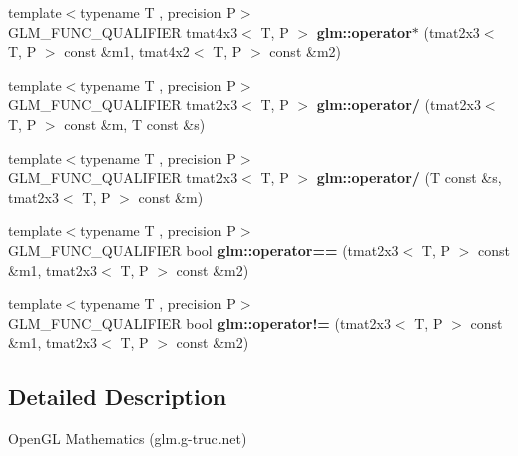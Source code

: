 \begin{DoxyCompactItemize}
\item 
\hypertarget{namespaceglm_ad6fbbb47791ef5cf25d6e85478b0ac07}{{\footnotesize template$<$typename T , precision P$>$ }\\G\-L\-M\-\_\-\-F\-U\-N\-C\-\_\-\-Q\-U\-A\-L\-I\-F\-I\-E\-R tmat4x3$<$ T, P $>$ {\bfseries glm\-::operator$\ast$} (tmat2x3$<$ T, P $>$ const \&m1, tmat4x2$<$ T, P $>$ const \&m2)}\label{namespaceglm_ad6fbbb47791ef5cf25d6e85478b0ac07}

\item 
\hypertarget{namespaceglm_a7bd8e96d855416d5a0bb2ee8933720d9}{{\footnotesize template$<$typename T , precision P$>$ }\\G\-L\-M\-\_\-\-F\-U\-N\-C\-\_\-\-Q\-U\-A\-L\-I\-F\-I\-E\-R tmat2x3$<$ T, P $>$ {\bfseries glm\-::operator/} (tmat2x3$<$ T, P $>$ const \&m, T const \&s)}\label{namespaceglm_a7bd8e96d855416d5a0bb2ee8933720d9}

\item 
\hypertarget{namespaceglm_a7f733aa2965f6acb67a211a5cd8dd2d0}{{\footnotesize template$<$typename T , precision P$>$ }\\G\-L\-M\-\_\-\-F\-U\-N\-C\-\_\-\-Q\-U\-A\-L\-I\-F\-I\-E\-R tmat2x3$<$ T, P $>$ {\bfseries glm\-::operator/} (T const \&s, tmat2x3$<$ T, P $>$ const \&m)}\label{namespaceglm_a7f733aa2965f6acb67a211a5cd8dd2d0}

\item 
\hypertarget{namespaceglm_ac912517a461de497022d75ec4de3dba5}{{\footnotesize template$<$typename T , precision P$>$ }\\G\-L\-M\-\_\-\-F\-U\-N\-C\-\_\-\-Q\-U\-A\-L\-I\-F\-I\-E\-R bool {\bfseries glm\-::operator==} (tmat2x3$<$ T, P $>$ const \&m1, tmat2x3$<$ T, P $>$ const \&m2)}\label{namespaceglm_ac912517a461de497022d75ec4de3dba5}

\item 
\hypertarget{namespaceglm_aa83d47e20bf01d8d4009de4d5440c457}{{\footnotesize template$<$typename T , precision P$>$ }\\G\-L\-M\-\_\-\-F\-U\-N\-C\-\_\-\-Q\-U\-A\-L\-I\-F\-I\-E\-R bool {\bfseries glm\-::operator!=} (tmat2x3$<$ T, P $>$ const \&m1, tmat2x3$<$ T, P $>$ const \&m2)}\label{namespaceglm_aa83d47e20bf01d8d4009de4d5440c457}

\end{DoxyCompactItemize}


\subsection{Detailed Description}
Open\-G\-L Mathematics (glm.\-g-\/truc.\-net)

